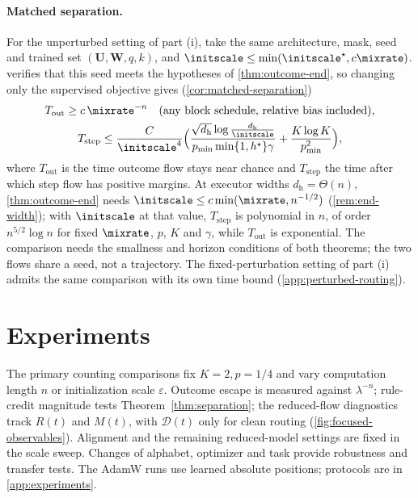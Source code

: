 \paragraph{Matched separation.} For the unperturbed setting of part (i), take the same architecture, mask, seed and trained set $(\mathbf U,\mathbf W,q,k)$, and $\initscale\le\min(\initscale^\star,c\mixrate)$.
 verifies that this seed meets the hypotheses of \cref{thm:outcome-end}, so changing only the supervised objective gives
(\cref{cor:matched-separation})
\begin{gather*}
 T_{\mathrm{out}}\ge c\,\mixrate^{-n}\quad\text{(any block schedule, relative bias included)},\\
 T_{\mathrm{step}}\le\frac{C}{\initscale^4}\Bigl(\frac{\sqrt{d_{\mathrm h}}\log\frac{d_{\mathrm h}}{\initscale}}{p_{\min}\min\{1,h^\star\}\gamma}+\frac{K\log K}{p_{\min}^2}\Bigr),
\end{gather*}
where $T_{\mathrm{out}}$ is the time outcome flow stays near chance and $T_{\mathrm{step}}$ the time after which step flow has positive margins. At executor
widths $d_{\mathrm h}=\Theta(n)$, \cref{thm:outcome-end} needs $\initscale\le c\min(\mixrate,n^{-1/2})$ (\cref{rem:end-width}); with $\initscale$ at that value, $T_{\mathrm{step}}$ is polynomial
in $n$, of order $n^{5/2}\log n$ for fixed $\mixrate$, $p$, $K$ and $\gamma$, while $T_{\mathrm{out}}$ is exponential. The comparison needs the smallness and horizon conditions of both theorems; the two flows share a seed, not a trajectory.
The fixed-perturbation setting of part (i) admits the same comparison with its own time bound (\cref{app:perturbed-routing}).

\suppressfloats[t]
\section{Experiments}
\label{sec:experiments}
\label{sec:validation}

The primary counting comparisons fix $K=2,p=1/4$ and vary computation length
$n$ or initialization scale $\varepsilon$. Outcome escape is measured against
$\lambda^{-n}$; rule-credit magnitude tests Theorem~\ref{thm:separation};
the reduced-flow diagnostics track $R(t)$ and $M(t)$, with $\mathcal D(t)$
only for clean routing (\cref{fig:focused-observables}). Alignment and the remaining
reduced-model settings are fixed in the scale sweep. Changes of alphabet,
optimizer and task provide robustness and transfer tests. The AdamW runs use
learned absolute positions; protocols are in \cref{app:experiments}.

